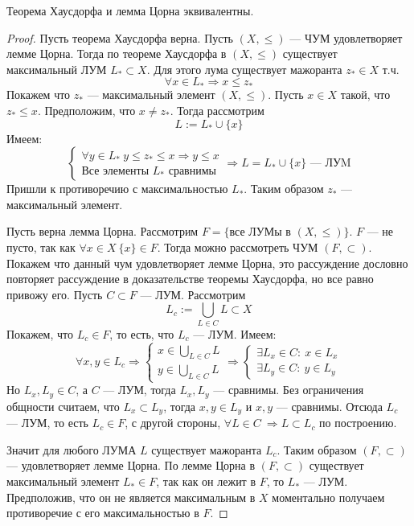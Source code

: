 \begin{claim}
	Теорема Хаусдорфа и лемма Цорна эквивалентны.
\end{claim}
\begin{proof}
Пусть теорема Хаусдорфа верна. Пусть $(X, \leq)$ --- ЧУМ удовлетворяет лемме Цорна. Тогда по теореме Хаусдорфа в $(X,\leq)$ существует максимальный ЛУМ  $L_* \subset X$. Для этого лума существует мажоранта $z_* \in X$ т.ч. 
		$$
		\forall x \in L_* \Rightarrow x \leq z_*
		$$
		Покажем что $z_*$ --- максимальный элемент $(X, \leq)$. Пусть $x \in X$ такой, что $z_* \leq x$. Предположим, что $ x \neq z_*$. Тогда рассмотрим 
		$$
		L := L_*\cup \{x\}
		$$
		Имеем:
		$$
		\begin{cases}
			\forall y \in L_*\ y \leq z_* \leq x \Rightarrow y \leq x \\
			\text{Все элементы } L_* \text{ сравнимы}	
		\end{cases} 
		\Rightarrow L = L_*\cup \{x\} \text{ --- ЛУM}
		$$
		Пришли к противоречию с максимальностью $L_*$. Таким образом $z_*$ --- максимальный элемент.
		
		 Пусть верна лемма Цорна. Рассмотрим $F = \{\text{все ЛУМы в } (X, \leq)\}$. $F$ --- не пусто, так как $\forall x \in X \ \{x\} \in F$. Тогда можно рассмотреть ЧУМ $(F, \subset)$. Покажем что данный чум удовлетворяет лемме Цорна, это рассуждение дословно повторяет рассуждение в доказательстве теоремы Хаусдорфа, но все равно привожу его. Пусть $C \subset F$ --- ЛУМ. Рассмотрим 
		$$
		L_c := \bigcup\limits_{L \in C}L \subset X
		$$
		Покажем, что $L_c \in F$, то есть, что $L_c$ --- ЛУМ. Имеем:
		$$
		\forall x,y \in L_c \Rightarrow 
		\begin{cases}
			x \in \bigcup\limits_{L \in C} L \\
			y \in \bigcup\limits_{L \in C} L 
		\end{cases} 
		\Rightarrow 
		\begin{cases}
			\exists L_x \in C:\ x \in L_x \\
			\exists L_y \in C:\ y \in L_y 
		\end{cases}
		$$
		Но $L_x, L_y \in C$, а $C$ --- ЛУМ, тогда $L_x, L_y$ --- сравнимы. Без ограничения общности считаем, что $L_x \subset L_y$, тогда $x, y \in L_y$ и $x,y$ --- сравнимы. Отсюда $L_c$ --- ЛУМ, то есть $L_c \in F$, с другой стороны, $\forall L \in C \ \Rightarrow L \subset L_c$ по построению. 
		
		Значит для любого ЛУМА $L$ существует мажоранта $L_c$. Таким образом $(F, \subset)$ --- удовлетворяет лемме Цорна. По лемме Цорна в $(F, \subset)$ существует максимальный элемент $L_* \in F$, так как он лежит в $F$, то $L_*$ --- ЛУМ. Предположив, что он не является максимальным в $X$ моментально получаем противоречие с его максимальностью в $F$. 
\end{proof}
